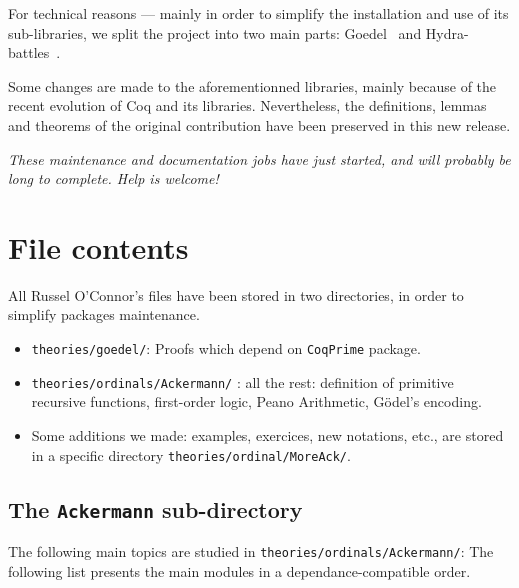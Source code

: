      
        For technical reasons --- mainly in order to simplify the installation and use of its sub-libraries, we split the project
into two main parts: Goedel~\cite{Goedel} and Hydra-battles~\cite{HydraBattles}.



Some changes are made to the aforementionned libraries, mainly because of the recent evolution of Coq and its libraries. Nevertheless, the definitions, lemmas and theorems of the original contribution have been preserved in this new release.

\emph{\color{red!80}These maintenance and documentation 
jobs have just started, and will probably be long to complete. Help is welcome!}





\section{File contents}

All Russel O'Connor's files have been stored in two directories, in order to simplify packages maintenance. 

\begin{itemize}
\item \texttt{theories/goedel/}: Proofs which depend on 
\texttt{CoqPrime} package.
\item  \texttt{theories/ordinals/Ackermann/} : all the rest:
 definition of primitive recursive functions, first-order  logic,
Peano Arithmetic, G\"{o}del's encoding.
\item Some additions we made: examples, exercices, new notations, etc.,  are stored in a specific directory \texttt{theories/ordinal/MoreAck/}.
\end{itemize}

\subsection{The \texttt{Ackermann} sub-directory}

The following main topics are studied in  \texttt{theories/ordinals/Ackermann/}: 
The following list presents the main modules 
in a dependance-compatible order.

